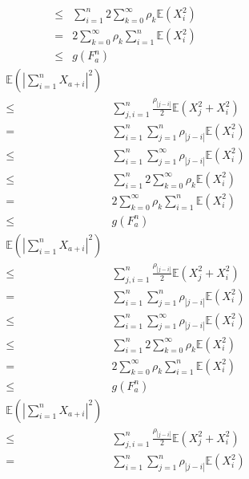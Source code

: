 \documentclass{ctexart}
\begin{document}
\begin{remark}
\begin{equation}
\begin{aligned}
      \leq & \sum_{i=1}^{n} 2\sum_{k=0}^{\infty} \rho_k \mathbb{E}(X_i^2)\\
      =& 2\sum_{k=0}^{\infty}\rho_k  \sum_{i=1}^{n}\mathbb{E}(X_i^2)\\
      \leq & g(F_a^n)
    \end{aligned}
  \end{equation}
  \begin{equation}
    \begin{aligned}
      \mathbb{E}(|\sum_{i=1}^{n}X_{a+i}|^2) \\
      \leq & \sum_{j,i = 1}^{n} \frac{\rho_{|j-i|}}{2}\mathbb{E}(X_j^2 + X_i^2)\\
      =& \sum_{i=1}^{n} \sum_{j=1}^{n}\rho_{|j-i|}\mathbb{E}(X_i^2)\\
      \leq & \sum_{i=1}^{n} \sum_{j=1}^{\infty} \rho_{|j-i|}\mathbb{E}(X_i^2)\\
      \leq & \sum_{i=1}^{n} 2\sum_{k=0}^{\infty} \rho_k \mathbb{E}(X_i^2)\\
      =& 2\sum_{k=0}^{\infty}\rho_k  \sum_{i=1}^{n}\mathbb{E}(X_i^2)\\
      \leq & g(F_a^n)
    \end{aligned}
  \end{equation}
  \begin{equation}
    \begin{aligned}
      \mathbb{E}(|\sum_{i=1}^{n}X_{a+i}|^2) \\
      \leq & \sum_{j,i = 1}^{n} \frac{\rho_{|j-i|}}{2}\mathbb{E}(X_j^2 + X_i^2)\\
      =& \sum_{i=1}^{n} \sum_{j=1}^{n}\rho_{|j-i|}\mathbb{E}(X_i^2)\\
      \leq & \sum_{i=1}^{n} \sum_{j=1}^{\infty} \rho_{|j-i|}\mathbb{E}(X_i^2)\\
      \leq & \sum_{i=1}^{n} 2\sum_{k=0}^{\infty} \rho_k \mathbb{E}(X_i^2)\\
      =& 2\sum_{k=0}^{\infty}\rho_k  \sum_{i=1}^{n}\mathbb{E}(X_i^2)\\
      \leq & g(F_a^n)
    \end{aligned}
  \end{equation}
  \begin{equation}
    \begin{aligned}
      \mathbb{E}(|\sum_{i=1}^{n}X_{a+i}|^2) \\
      \leq & \sum_{j,i = 1}^{n} \frac{\rho_{|j-i|}}{2}\mathbb{E}(X_j^2 + X_i^2)\\
      =& \sum_{i=1}^{n} \sum_{j=1}^{n}\rho_{|j-i|}\mathbb{E}(X_i^2)\\

\end{aligned}
\end{equation}
\end{remark}
\end{document}
